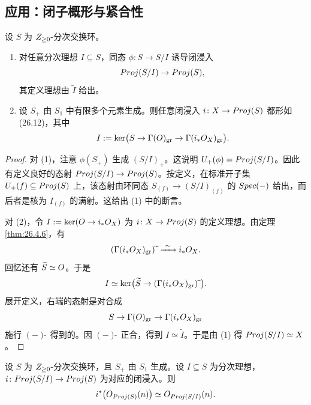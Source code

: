 \subsection{应用：闭子概形与紧合性}\label{sec:26.5}

\begin{theorem}\label{thm:26.5.1}
设 $S$ 为 $Z_{\ge 0}$-分次交换环。
\begin{enumerate}[label=(\arabic*),leftmargin=2.4em,itemsep=0.4ex]
  \item 对任意分次理想 $I \subseteq S$，同态 $\phi \colon S \to S/I$ 诱导闭浸入
  \begin{equation}\label{eq:26.12}
  Proj(S/I) \to Proj(S),
  \end{equation}
  其定义理想由 $\widetilde{I}$ 给出。
  \item 设 $S_+$ 由 $S_1$ 中有限多个元素生成。则任意闭浸入 $i \colon X \to Proj(S)$ 都形如 (26.12)，其中
  \[
  I := \ker\bigl(S \to \Gamma(O)_{\mathrm{gr}} \to \Gamma(i_*O_X)_{\mathrm{gr}}\bigr).
  \]
\end{enumerate}
\end{theorem}

\begin{proof}
对 (1)，注意 $\phi(S_+)$ 生成 $(S/I)_+$。这说明 $U_+(\phi) = Proj(S/I)$。因此有定义良好的态射 $Proj(S/I) \to Proj(S)$。按定义，在标准开子集 $U_+(f) \subseteq Proj(S)$ 上，该态射由环同态 $S_{(f)} \to (S/I)_{(f)}$ 的 $Spec(-)$ 给出，而后者是核为 $I_{(f)}$ 的满射。这给出 (1) 中的断言。

对 (2)，令 $I := \ker(O \to i_*O_X)$ 为 $i \colon X \to Proj(S)$ 的定义理想。由定理 \ref{thm:26.4.6}，有
\[
(\Gamma(i_*O_X)_{\mathrm{gr}})\widetilde{\ } \xrightarrow{\ \sim\ } i_*O_X.
\]
回忆还有 $\widetilde{S} \simeq O$。于是
\[
I \simeq \ker\bigl(\widetilde{S} \to (\Gamma(i_*O_X)_{\mathrm{gr}})\widetilde{\ }\bigr).
\]
展开定义，右端的态射是对合成
\[
S \to \Gamma(O)_{\mathrm{gr}} \to \Gamma(i_*O_X)_{\mathrm{gr}}
\]
施行 $(-)\widetilde{\ }$ 得到的。因 $(-)\widetilde{\ }$ 正合，得到 $I \simeq \widetilde{I}$。于是由 (1) 得 $Proj(S/I) \simeq X$。
\end{proof}

\begin{exercise}\label{exc:26.5.2}
设 $S$ 为 $Z_{\ge 0}$-分次交换环，且 $S_+$ 由 $S_1$ 生成。设 $I \subseteq S$ 为分次理想，$i \colon Proj(S/I) \to Proj(S)$ 为对应的闭浸入。则
\[
i^*\bigl(O_{Proj(S)}(n)\bigr) \simeq O_{Proj(S/I)}(n).
\]
\end{exercise}

